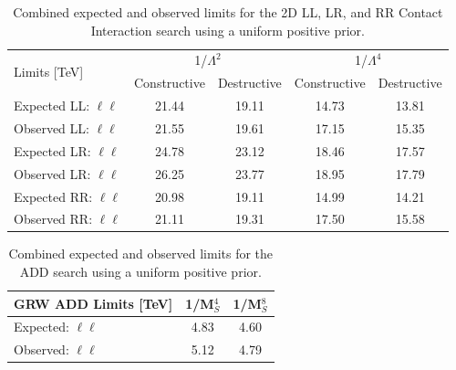 \begin{table}[p]
\centering
\begin{tabular}{ l|c|c|c|c }
    \hline
    \hline
    \multirow{2}{*}{Limits [TeV]} & \multicolumn{2}{c|}{1/$\Lambda^2$} & \multicolumn{2}{c}{1/$\Lambda^4$} \\
    \cline{2-5}
     & Constructive & Destructive & Constructive & Destructive \\
    \hline
    Expected LL: $\ell\ell$ & 21.44 & 19.11 & 14.73 & 13.81 \\
    Observed LL: $\ell\ell$  & 21.55 & 19.61 & 17.15 & 15.35 \\
    \hline
    Expected LR: $\ell\ell$ & 24.78 & 23.12 & 18.46 & 17.57 \\
    Observed LR: $\ell\ell$ & 26.25 & 23.77 & 18.95 & 17.79 \\
    \hline
    Expected RR: $\ell\ell$ & 20.98 & 19.11 & 14.99 & 14.21 \\
    Observed RR: $\ell\ell$ & 21.11 & 19.31 & 17.50 & 15.58 \\
    \hline
    \hline
\end{tabular}
\caption{Combined expected and observed limits for the 2D LL, LR, and RR Contact Interaction search using a uniform positive prior.}
\label{tab:Comb_Limits_CI}
\end{table}


\begin{table}[p]
\centering
\begin{tabular}{ l | c | c }
    \hline
    \hline
    GRW ADD Limits [TeV] & 1/M$_S^4$ & 1/M$_S^8$ \\
    \hline
    Expected: $\ell\ell$ & 4.83 & 4.60 \\
    Observed: $\ell\ell$ & 5.12 & 4.79 \\
    \hline
    \hline
\end{tabular}
\caption{Combined expected and observed limits for the ADD search using a uniform positive prior.}
\label{tab:Comb_Limits_ADD}
\end{table}




